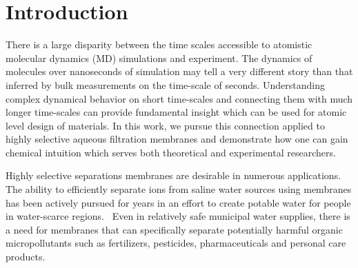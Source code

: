 \documentclass[journal=jctcce,manuscript=article]{achemso}
\begin{document}
  \maketitle
  
  \graphicspath{{./figures/}}

  \section{Introduction}

  There is a large disparity between the time scales accessible to atomistic 
  molecular dynamics (MD) simulations and experiment. The dynamics of molecules 
  over nanoseconds of simulation may tell a very different story than that 
  inferred by bulk measurements on the time-scale of seconds. Understanding 
  complex dynamical behavior on short time-scales and connecting them with much
  longer time-scales can provide fundamental insight which can be used for 
  atomic level design of materials. In this work, we pursue this connection 
  applied to highly selective aqueous filtration membranes and demonstrate how
  one can gain chemical intuition which serves both theoretical and experimental
  researchers.

  Highly selective separations membranes are desirable in numerous
  applications. The ability to efficiently separate ions from saline water
  sources using membranes has been actively pursued for years in an effort to
  create potable water for people in water-scarce
  regions.~\cite{werber_materials_2016} Even in relatively safe municipal water
  supplies, there is a need for membranes that can specifically separate
  potentially harmful organic micropollutants such as fertilizers, pesticides,
  pharmaceuticals and personal care products.~\cite{barbosa_occurrence_2016} 
\end{document}
